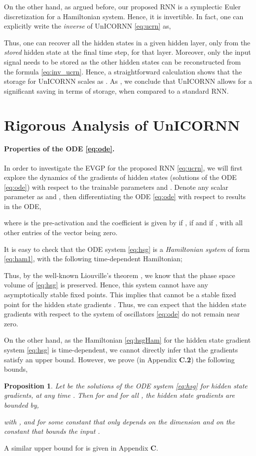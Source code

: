 \documentclass[a4paper]{article}
\newtheorem{proposition}[theorem]{Proposition}
\begin{document}
On the other hand, as argued before, our proposed RNN is a symplectic Euler discretization for a Hamiltonian system. Hence, it is invertible. In fact, one can explicitly write the \emph{inverse} of UnICORNN \eqref{eq:ucrn} as,

Thus, one can recover all the hidden states in a given hidden layer, only from the \emph{stored} hidden state at the final time step, for that layer. Moreover, only the input signal needs to be stored as the other hidden states can be reconstructed from the formula \eqref{eq:inv_ucrn}. Hence, a straightforward calculation shows that the storage for UnICORNN scales as . As , we conclude that UnICORNN allows for a significant saving in terms of storage, when compared to a standard RNN. 
\section{Rigorous Analysis of UnICORNN}
\paragraph{Properties of the ODE \eqref{eq:ode}.}
In order to investigate the EVGP for the proposed RNN \eqref{eq:ucrn}, we will first explore the dynamics of the gradients of hidden states  (solutions of the ODE \eqref{eq:ode}) with respect to the trainable parameters  and . Denote any scalar parameter as  and , then differentiating the ODE \eqref{eq:ode} with respect to  results in the ODE,

where  is the pre-activation and the coefficient  is given by  if ,   if  and  if , with all other entries of the vector  being zero.

It is easy to check that the ODE system \eqref{eq:hsg} is a \emph{Hamiltonian system} of form \eqref{eq:ham1}, with the following time-dependent Hamiltonian;

Thus, by the well-known Liouville's theorem \cite{ss1}, we know that the phase space volume of \eqref{eq:hsg} is preserved. Hence, this system cannot have any asymptotically stable fixed points. This implies that  cannot be a stable fixed point for the hidden state gradients . Thus, we can expect that the hidden state gradients with respect to the system of oscillators \eqref{eq:ode} do not remain near zero.     

On the other hand, as the Hamiltonian \eqref{eq:hsgHam} for the hidden state gradient system \eqref{eq:hsg} is time-dependent, we cannot directly infer that the gradients satisfy an upper bound. However, we prove (in Appendix {\bf C.2}) the following bounds,
\begin{proposition}
\label{prop:n2}
Let  be the solutions of the ODE system \eqref{eq:hsg} for hidden state gradients, at any time . Then for  and for all , the hidden state gradients are bounded by,

with , and for some constant  that only depends on the dimension  and on the constant  that bounds the input .
\end{proposition}
A similar upper bound for  is given in Appendix {\bf C}.
\end{document}
